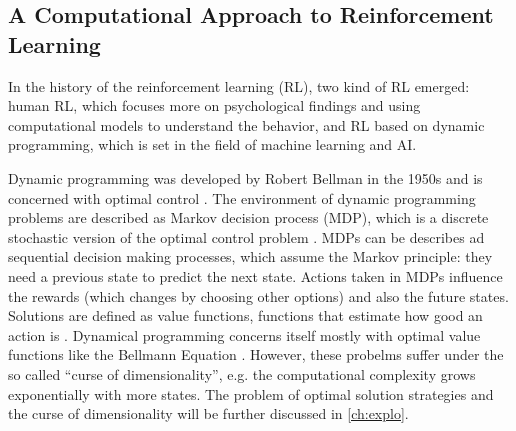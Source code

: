 \subsection{A Computational Approach to Reinforcement Learning}
In the history of the reinforcement learning (RL), two kind of RL emerged: human RL, which focuses more on psychological findings and using computational models to understand the behavior, and RL based on dynamic programming, which is set in the field of machine learning and AI. 

Dynamic programming \citep{bellman1960dynamic} was developed by Robert Bellman in the 1950s and is concerned with optimal control \citep{sutton2018reinforcement}. The environment of dynamic programming problems are described as Markov decision process (MDP), which is a discrete stochastic version of the optimal control problem \citep{sutton2018reinforcement}. MDPs can be describes ad sequential decision making processes, which assume the Markov principle: they need a previous state to predict the next state. Actions taken in MDPs influence the rewards (which changes by choosing other options) and also the future states. Solutions are defined as value functions, functions that estimate how good an action is \citep{sutton2018reinforcement}. Dynamical programming concerns itself mostly with optimal value functions like the Bellmann Equation \citep{bellman1960dynamic}. However, these probelms suffer under the so called ``curse of dimensionality''\citep{sutton2018reinforcement}, e.g. the computational complexity grows exponentially with more states. The problem of optimal solution strategies and the curse of dimensionality will be further discussed in \ref{ch:explo}.



